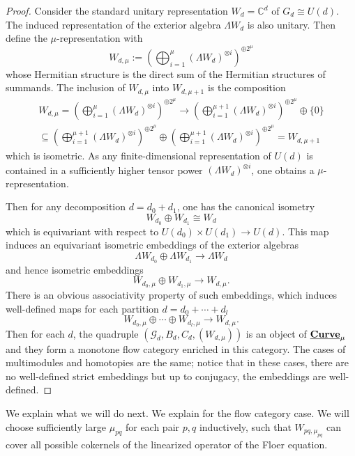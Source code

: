 \documentclass[reqno, 10pt]{amsart}
\numberwithin{equation}{section}
\numberwithin{equation}{section}
\renewcommand{\subset}{\subseteq}
\theoremstyle{definition}
\theoremstyle{remark}
\newcommand{\beqn}{\begin{equation*}}
\newcommand{\eeqn}{\end{equation*}}
\newcommand{\mb}{\mathbb}
\newcommand{\mc}{\mathcal}
\newcommand{\uds}[1]{\underline{\smash{#1}}}
\begin{document}
\begin{proof}
Consider the standard unitary representation $W_d = {\mb C}^d$ of $G_d \cong U(d)$. The induced representation of the exterior algebra $\Lambda W_d$ is also unitary. Then define the $\mu$-representation with 
\beqn
W_{d, \mu}:= \left( \bigoplus_{i=1}^\mu (\Lambda W_d)^{\otimes i} \right)^{\oplus 2^\mu}
\eeqn
whose Hermitian structure is the direct sum of the Hermitian structures of summands. The inclusion of $W_{d, \mu}$ into $W_{d, \mu+1}$ is the composition
\begin{multline*}
W_{d, \mu} = \left( \bigoplus_{i=1}^\mu (\Lambda W_d)^{\otimes i} \right)^{\oplus 2^\mu} \to 
\left( \bigoplus_{i=1}^{\mu+1} (\Lambda W_d)^{\otimes i} \right)^{\oplus 2^\mu} \oplus \{0\} \\
\subset 
\left( \bigoplus_{i=1}^{\mu+1} (\Lambda W_d)^{\otimes i} \right)^{\oplus 2^\mu} \oplus
\left( \bigoplus_{i=1}^{\mu+1} (\Lambda W_d)^{\otimes i} \right)^{\oplus 2^\mu} = W_{d, \mu+1}
\end{multline*}
which is isometric. As any finite-dimensional representation of $U(d)$ is contained in a sufficiently higher tensor power $(\Lambda W_d)^{\otimes i}$, one obtains a $\mu$-representation.



Then for any decomposition $d = d_0 + d_1$, one has the canonical isometry
\beqn
W_{d_0} \oplus W_{d_1} \cong W_d
\eeqn
which is equivariant with respect to $U(d_0) \times U(d_1) \to U(d)$. This map induces an equivariant isometric embeddings of the exterior algebras
\beqn
\Lambda W_{d_0} \oplus \Lambda W_{d_1} \to \Lambda W_d
\eeqn
and hence isometric embeddings
\beqn
W_{d_0, \mu} \oplus W_{d_1, \mu} \to W_{d, \mu}.
\eeqn
There is an obvious associativity property of such embeddings, which induces well-defined maps for each partition $d = d_0 + \cdots + d_l$
\beqn
W_{d_0, \mu} \oplus \cdots \oplus W_{d_l, \mu} \to W_{d, \mu}.
\eeqn
Then for each $d$, the quadruple $({\mc G}_d, B_d, C_d, (W_{d, \mu}))$ is an object of $\uds{\bf Curve}_\mu$ and they form a monotone flow category enriched in this category. The cases of multimodules and homotopies are the same; notice that in these cases, there are no well-defined strict embeddings but up to conjugacy, the embeddings are well-defined.
\end{proof}

We explain what we will do next. We explain for the flow category case. We will choose sufficiently large $\mu_{pq}$ for each pair $p, q$ inductively, such that $W_{pq, \mu_{pq}}$ can cover all possible cokernels of the linearized operator of the Floer equation. 
\end{document}
